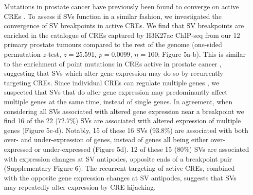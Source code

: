 Mutations in prostate cancer have previously been found to converge on active CREs \cite{mazrooeiCistromePartitioningReveals2019}.
To assess if SVs function in a similar fashion, we investigated the convergence of SV breakpoints in active CREs.
We find that SV breakpoints are enriched in the catalogue of CREs captured by H3K27ac ChIP-seq from our 12 primary prostate tumours compared to the rest of the genome (one-sided permutation $z$-test, $z = 25.591$, $p = 0.0099$, $n = 100$; Figure 5a-b).
This is similar to the enrichment of point mutations in CREs active in prostate cancer \cite{mazrooeiCistromePartitioningReveals2019}, suggesting that SVs which alter gene expression may do so by recurrently targeting CREs.
Since individual CREs can regulate multiple genes \cite{gasperiniGenomewideFrameworkMapping2019}, we suspected that SVs that do alter gene expression may predominantly affect multiple genes at the same time, instead of single genes.
In agreement, when considering all SVs associated with altered gene expression near a breakpoint we find 16 of the 22 (72.7\%) SVs are associated with altered expression of multiple genes (Figure 5c-d).
Notably, 15 of these 16 SVs (93.8\%) are associated with both over- and under-expression of genes, instead of genes all being either over-expressed or under-expressed (Figure 5d).
12 of these 15 (80\%) SVs are associated with expression changes at SV antipodes, opposite ends of a breakpoint pair (Supplementary Figure 6).
The recurrent targeting of active CREs, combined with the opposite gene expression changes at SV antipodes, suggests that SVs may repeatedly alter expression by CRE hijacking.

